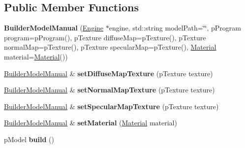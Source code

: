 \subsection*{Public Member Functions}
\begin{DoxyCompactItemize}
\item 
\hypertarget{classfillwave_1_1models_1_1BuilderModelManual_ae16bb5619140123b1446ea6742a3a17b}{}{\bfseries Builder\+Model\+Manual} (\hyperlink{classfillwave_1_1Engine}{Engine} $\ast$engine, std\+::string model\+Path=\char`\"{}\char`\"{}, p\+Program program=p\+Program(), p\+Texture diffuse\+Map=p\+Texture(), p\+Texture normal\+Map=p\+Texture(), p\+Texture specular\+Map=p\+Texture(), \hyperlink{classfillwave_1_1models_1_1Material}{Material} material=\hyperlink{classfillwave_1_1models_1_1Material}{Material}())\label{classfillwave_1_1models_1_1BuilderModelManual_ae16bb5619140123b1446ea6742a3a17b}

\item 
\hypertarget{classfillwave_1_1models_1_1BuilderModelManual_ace188d0d7cf3af006137b930fc44a0d0}{}\hyperlink{classfillwave_1_1models_1_1BuilderModelManual}{Builder\+Model\+Manual} \& {\bfseries set\+Diffuse\+Map\+Texture} (p\+Texture texture)\label{classfillwave_1_1models_1_1BuilderModelManual_ace188d0d7cf3af006137b930fc44a0d0}

\item 
\hypertarget{classfillwave_1_1models_1_1BuilderModelManual_af386bc9269b82922dc99f847ef85e226}{}\hyperlink{classfillwave_1_1models_1_1BuilderModelManual}{Builder\+Model\+Manual} \& {\bfseries set\+Normal\+Map\+Texture} (p\+Texture texture)\label{classfillwave_1_1models_1_1BuilderModelManual_af386bc9269b82922dc99f847ef85e226}

\item 
\hypertarget{classfillwave_1_1models_1_1BuilderModelManual_a4940ba4e2067c4b7b403825aad4ebaff}{}\hyperlink{classfillwave_1_1models_1_1BuilderModelManual}{Builder\+Model\+Manual} \& {\bfseries set\+Specular\+Map\+Texture} (p\+Texture texture)\label{classfillwave_1_1models_1_1BuilderModelManual_a4940ba4e2067c4b7b403825aad4ebaff}

\item 
\hypertarget{classfillwave_1_1models_1_1BuilderModelManual_ab59b00511f4cc4c08fa34589fcb88918}{}\hyperlink{classfillwave_1_1models_1_1BuilderModelManual}{Builder\+Model\+Manual} \& {\bfseries set\+Material} (\hyperlink{classfillwave_1_1models_1_1Material}{Material} material)\label{classfillwave_1_1models_1_1BuilderModelManual_ab59b00511f4cc4c08fa34589fcb88918}

\item 
\hypertarget{classfillwave_1_1models_1_1BuilderModelManual_a8ec62dc9a91ed585dd9d3830069897b7}{}p\+Model {\bfseries build} ()\label{classfillwave_1_1models_1_1BuilderModelManual_a8ec62dc9a91ed585dd9d3830069897b7}

\end{DoxyCompactItemize}
